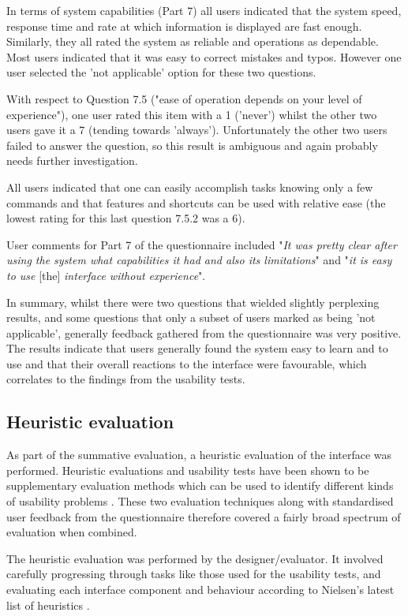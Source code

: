 In terms of system capabilities (Part 7) all users indicated that the system speed, response time and rate at which information is displayed are fast enough. Similarly, they all rated the system as reliable and operations as dependable. Most users indicated that it was easy to correct mistakes and typos.  However one user selected the 'not applicable' option for these two questions. 

With respect to Question 7.5 ("ease of operation depends on your level of experience"), one user rated this item with a 1 ('never') whilst the other two users gave it a 7 (tending towards 'always'). Unfortunately the other two users failed to answer the question, so this result is ambiguous and again probably needs further investigation. 

All users indicated that one can easily accomplish tasks knowing only a few commands and that features and shortcuts can be used with relative ease (the lowest rating for this last question 7.5.2 was a 6).

User comments for Part 7 of the questionnaire included "\textit{It was pretty clear after using the system what capabilities it had and also its limitations}" and "\textit{it is easy to use} [the] \textit{interface without experience}".

In summary, whilst there were two questions that wielded slightly perplexing results, and some questions that only a subset of users marked as being 'not applicable', generally feedback gathered from the questionnaire was very positive. The results indicate that users generally found the system easy to learn and to use and that their overall reactions to the interface were favourable, which correlates to the findings from the usability tests.

\subsection{Heuristic evaluation}
As part of the summative evaluation, a heuristic evaluation of the interface was performed. Heuristic evaluations and usability tests have been shown to be supplementary evaluation methods which can be used to identify different kinds of usability problems \citep{Nielsen1995}. These two evaluation techniques along with standardised user feedback from the questionnaire therefore covered a fairly broad spectrum of evaluation when combined. 

The heuristic evaluation was performed by the designer/evaluator. It involved carefully progressing through tasks like those used for the usability tests, and evaluating each interface component and behaviour according to Nielsen's latest list of heuristics \citep{NielsenMack}. 

